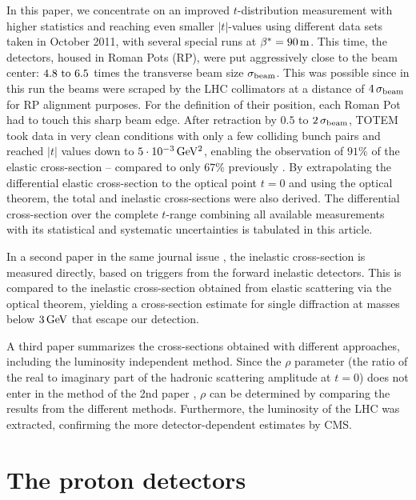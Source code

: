 \documentclass[doublecol]{../macros/epl2}
\def\un#1{\,{\rm #1}}
\begin{document}
In this paper, we concentrate on an improved $t$-distribution measurement with higher statistics and reaching even smaller $|t|$-values using different data sets taken in October 2011, with several special runs at $\beta^* = 90\un{m}$. This time, the detectors, housed in Roman Pots (RP), were put aggressively close to the beam center: $4.8 \hbox{ to } 6.5$ times the transverse beam size $\sigma_{\rm beam}$. This was possible since in this run the beams were scraped by the LHC collimators at a distance of $4\,\sigma_{\rm beam}$ for RP alignment purposes. For the definition of their position, each Roman Pot had to touch this sharp beam edge. After retraction by $0.5$ to $2\,\sigma_{\rm beam}$, TOTEM took data in very clean conditions with only a few colliding bunch pairs and reached $|t|$ values down to $5\cdot10^{-3}\un{GeV^2}$, enabling the observation of $91\%$ of the elastic cross-section -- compared to only $67\%$ previously \cite{epl96}. By extrapolating the differential elastic cross-section to the optical point $t=0$ and using the optical theorem, the total and inelastic cross-sections were also derived. The differential cross-section over the complete $t$-range combining all available measurements with its statistical and systematic uncertainties is tabulated in this article.

In a second paper in the same journal issue \cite{P2}, the inelastic cross-section is measured directly, based on triggers from the forward inelastic detectors. This is compared to the inelastic cross-section obtained from elastic scattering via the optical theorem, yielding a cross-section estimate for single diffraction at masses below $3\un{GeV}$ that escape our detection.

A third paper \cite{P3} summarizes the cross-sections obtained with different approaches, including the luminosity independent method. Since the $\rho$ parameter (the ratio of the real to imaginary part of the hadronic scattering amplitude at $t=0$) does not enter in the method of the 2nd paper \cite{P2}, $\rho$ can be determined by comparing the results from the different methods. Furthermore, the luminosity of the LHC was extracted, confirming the more detector-dependent estimates by CMS. 



\section{The proton detectors}
\end{document}
